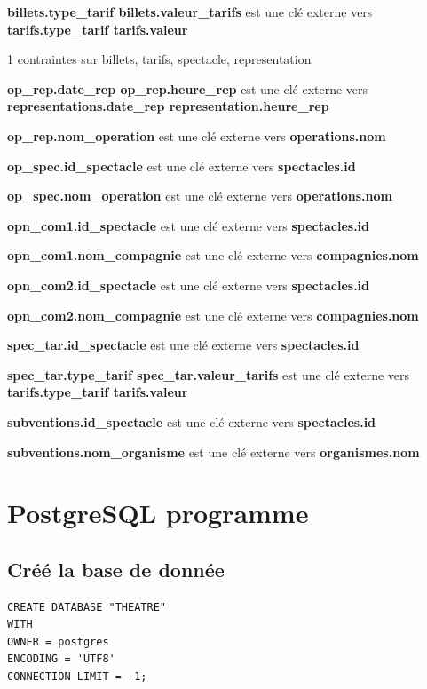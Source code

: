 \documentclass[10pt]{report}
\begin{document}
\textbf{billets.type\_tarif billets.valeur\_tarifs} est une clé externe vers \textbf{tarifs.type\_tarif tarifs.valeur}

1 contraintes  sur billets, tarifs, spectacle, representation

\textbf{op\_rep.date\_rep op\_rep.heure\_rep} est une clé externe vers  \textbf{representations.date\_rep representation.heure\_rep}

\textbf{op\_rep.nom\_operation} est une clé externe vers  \textbf{operations.nom}

\textbf{op\_spec.id\_spectacle} est une clé externe vers \textbf{spectacles.id}

\textbf{op\_spec.nom\_operation} est une clé externe vers  \textbf{operations.nom}

\textbf{opn\_com1.id\_spectacle} est une clé externe vers \textbf{spectacles.id}

\textbf{opn\_com1.nom\_compagnie} est une clé externe vers \textbf{compagnies.nom}

\textbf{opn\_com2.id\_spectacle} est une clé externe vers \textbf{spectacles.id}

\textbf{opn\_com2.nom\_compagnie} est une clé externe vers \textbf{compagnies.nom}

\textbf{spec\_tar.id\_spectacle} est une clé externe vers \textbf{spectacles.id}

\textbf{spec\_tar.type\_tarif spec\_tar.valeur\_tarifs} est une clé externe vers \textbf{tarifs.type\_tarif tarifs.valeur}

\textbf{subventions.id\_spectacle} est une clé externe vers \textbf{spectacles.id}

\textbf{subventions.nom\_organisme} est une clé externe vers \textbf{organismes.nom}

\chapter{PostgreSQL programme}
\section{Créé la base de donnée}
\begin{lstlisting}
CREATE DATABASE "THEATRE"
WITH 
OWNER = postgres
ENCODING = 'UTF8'
CONNECTION LIMIT = -1;
\end{lstlisting}
\end{document}
